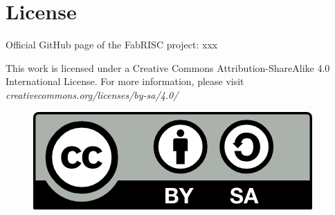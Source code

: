 \section[License]{License}

    \vspace{10pt}

    Official GitHub page of the FabRISC project: xxx

    \vspace{10pt}

    This work is licensed under a Creative Commons Attribution-ShareAlike 4.0 International License. For more information, please visit \textit{creativecommons.org/licenses/by-sa/4.0/}

    \begin{figure}[hbt!]

        \includegraphics[scale = 0.8]{./Images/LICENSE.png}
        \label{fig:LICENSE}
        
    \end{figure}